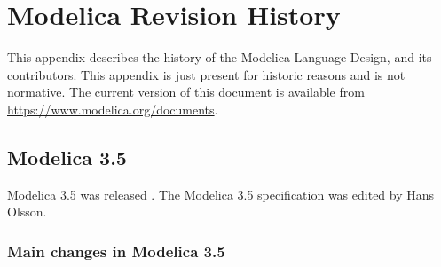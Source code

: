 \chapter{Modelica Revision History}\label{modelica-revision-history}

This appendix describes the history of the Modelica Language Design, and
its contributors. This appendix is just present for historic reasons and
is not normative. The current version of this document is available from
\url{https://www.modelica.org/documents}.

\section{Modelica 3.5}\label{modelica-3-5}
Modelica 3.5 was released \mlsdate.
The Modelica 3.5 specification was edited by Hans Olsson.

\subsection{Main changes in Modelica 3.5}\label{main-changes-in-modelica-3-5}

